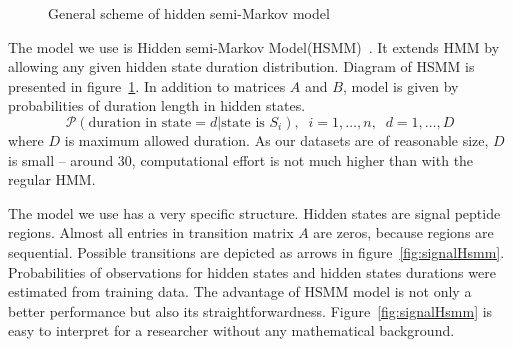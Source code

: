 \documentclass[fleqn,10pt,twoside]{gcb15submission}
\begin{document}
\begin{figure}[h]
\caption{General scheme of hidden semi-Markov model}
\label{fig:hsmm}
\end{figure}

The model we use is Hidden semi-Markov Model(HSMM)~\citep{Yu2010215}. It extends HMM by allowing 
any given hidden state duration distribution. Diagram of HSMM is presented in figure~\ref{fig:hsmm}.
In addition to matrices $A$ and $B$, model is given by probabilities of duration length in hidden states.
$$\mathcal{P}(\text{duration in state} = d | \text{state is } S_i), \;\; i = 1, \dots, n, \;\; d = 1, \dots, D$$
where $D$ is maximum allowed duration.
As our datasets are of reasonable size, $D$ is small -- around 30, computational effort is not much 
higher than with the regular HMM. 

The model we use has a very specific structure. Hidden states are signal peptide regions.
Almost all entries in transition matrix $A$ are zeros, because regions are sequential.
Possible transitions are depicted as arrows in figure~\ref{fig:signalHsmm}.
Probabilities of observations for hidden states and hidden states durations were estimated from training data.
The advantage of HSMM model is not only a better performance but also its straightforwardness.
Figure~\ref{fig:signalHsmm} is easy to interpret for a researcher without any mathematical background.
\end{document}
